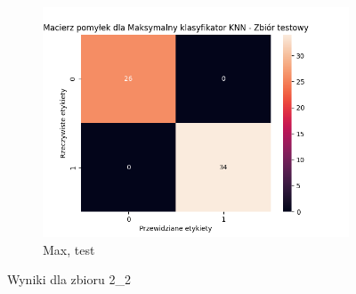 \documentclass[12pt]{article}
\newcommand*{\subfigwidth}{0.15\textwidth}
\begin{document}
\begin{figure}[H]
\begin{subfigure}[t]{\subfigwidth}
        \includegraphics[width=\linewidth]{img/exp_2/knn/2_2/max/test_matrix.png}
        \caption{Max, test}
    \end{subfigure} 
    
    \caption{Wyniki dla zbioru 2\_2}
\end{figure}
\end{document}
